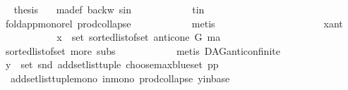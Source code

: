 \begin{isabellebody}
\ \isamarkupfalse%
\ {\isacharquery}{\kern0pt}thesis\ \isamarkupfalse%
\ \ ma{\isacharunderscore}{\kern0pt}def\ backw\ s{\isacharunderscore}{\kern0pt}in\isanewline
\ \ \ \ \ \ \ \ \ \ \isamarkupfalse%
\ t{\isacharunderscore}{\kern0pt}in\ \isanewline
\ \ \ \ \ \ \ \ \ \ \isamarkupfalse%
\ fold{\isacharunderscore}{\kern0pt}app{\isacharunderscore}{\kern0pt}mono{\isacharunderscore}{\kern0pt}rel\ prod{\isachardot}{\kern0pt}collapse\isanewline
\ \ \ \ \ \ \ \ \ \ \isamarkupfalse%
\ metis\ \ \ \ \ \isanewline
\ \ \ \ \ \ \isamarkupfalse%
\isanewline
\ \ \ \ \ \ \ \ \isamarkupfalse%
\ x{\isacharunderscore}{\kern0pt}ant\isanewline
\ \ \ \ \ \ \ \ \isamarkupfalse%
\ \isamarkupfalse%
\ {\isachardoublequoteopen}x\ {\isasymin}\ set\ {\isacharparenleft}{\kern0pt}sorted{\isacharunderscore}{\kern0pt}list{\isacharunderscore}{\kern0pt}of{\isacharunderscore}{\kern0pt}set\ {\isacharparenleft}{\kern0pt}anticone\ G\ ma{\isacharparenright}{\kern0pt}{\isacharparenright}{\kern0pt}{\isachardoublequoteclose}\ \isanewline
\ \ \ \ \ \ \ \ \ \ \isamarkupfalse%
\ sorted{\isacharunderscore}{\kern0pt}list{\isacharunderscore}{\kern0pt}of{\isacharunderscore}{\kern0pt}set{\isacharparenleft}{\kern0pt}{}{\isacharparenright}{\kern0pt}\ more\ subs\isanewline
\ \ \ \ \ \ \ \ \ \ \isamarkupfalse%
\ {\isacharparenleft}{\kern0pt}metis\ DAG{\isachardot}{\kern0pt}anticon{\isacharunderscore}{\kern0pt}finite{\isacharparenright}{\kern0pt}\ \isanewline
\ \ \ \ \ \ \ \ \isamarkupfalse%
\ \isamarkupfalse%
\ {\isachardoublequoteopen}y\ {\isasymin}\ set\ {\isacharparenleft}{\kern0pt}snd\ {\isacharparenleft}{\kern0pt}add{\isacharunderscore}{\kern0pt}set{\isacharunderscore}{\kern0pt}list{\isacharunderscore}{\kern0pt}tuple\ {\isacharparenleft}{\kern0pt}choose{\isacharunderscore}{\kern0pt}max{\isacharunderscore}{\kern0pt}blue{\isacharunderscore}{\kern0pt}set\ pp{\isacharparenright}{\kern0pt}{\isacharparenright}{\kern0pt}{\isacharparenright}{\kern0pt}{\isachardoublequoteclose}\isanewline
\ \ \ \ \ \ \ \ \ \ \isamarkupfalse%
\ \ add{\isacharunderscore}{\kern0pt}set{\isacharunderscore}{\kern0pt}list{\isacharunderscore}{\kern0pt}tuple{\isacharunderscore}{\kern0pt}mono\ in{\isacharunderscore}{\kern0pt}mono\ prod{\isachardot}{\kern0pt}collapse\ y{\isacharunderscore}{\kern0pt}in{\isacharunderscore}{\kern0pt}base\isanewline
\ \ \ \ \ \ \ \ \ \ \isamarkupfalse%

\end{isabellebody}
